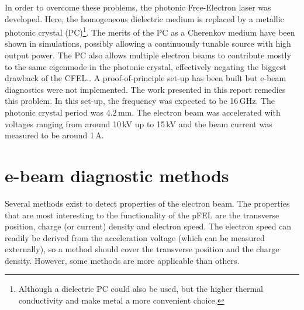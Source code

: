 In order to overcome these problems, the photonic Free-Electron laser was developed. Here, the homogeneous dielectric medium is replaced by a metallic photonic crystal (PC)\footnote{Although a dielectric PC could also be used, but the higher thermal conductivity and  make metal a more convenient choice.}.
The merits of the PC as a Cherenkov medium have been shown in simulations, possibly allowing a continuously tunable source with high output power.
The PC also allows multiple electron beams to contribute mostly to the same eigenmode in the photonic crystal, effectively negating the biggest drawback of the CFEL.\cite{DenisMultiBeam}.
A proof-of-principle set-up has been built \cite{Denis} but e-beam diagnostics were not implemented. The work presented in this report remedies this problem.
In this set-up, the frequency was expected to be 16\,GHz. The photonic crystal period was 4.2\,mm. The electron beam was accelerated with voltages ranging from around 10\,kV up to 15\,kV and the beam current was measured to be around 1\,A.

\section{e-beam diagnostic methods}
Several methods exist to detect properties of the electron beam. The properties that are most interesting to the functionality of the pFEL are the transverse position, charge (or current) density and electron speed. The electron speed can readily be derived from the acceleration voltage (which can be measured externally), so a method should cover the transverse position and the charge density. 
However, some methods are more applicable than others.

